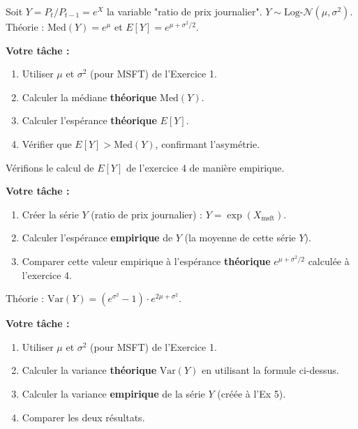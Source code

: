 \begin{exercicebox}
Soit $Y = P_t/P_{t-1} = e^X$ la variable "ratio de prix journalier". $Y \sim \text{Log-}\mathcal{N}(\mu, \sigma^2)$.
Théorie : $\text{Med}(Y) = e^{\mu}$ et $E[Y] = e^{\mu + \sigma^2/2}$.

\textbf{Votre tâche :}
\begin{enumerate}
    \item Utiliser $\mu$ et $\sigma^2$ (pour MSFT) de l'Exercice 1.
    \item Calculer la médiane \textbf{théorique} $\text{Med}(Y)$.
    \item Calculer l'espérance \textbf{théorique} $E[Y]$.
    \item Vérifier que $E[Y] > \text{Med}(Y)$, confirmant l'asymétrie.
\end{enumerate}
\end{exercicebox}

\begin{exercicebox}
Vérifions le calcul de $E[Y]$ de l'exercice 4 de manière empirique.

\textbf{Votre tâche :}
\begin{enumerate}
    \item Créer la série $Y$ (ratio de prix journalier) : $Y = \exp(X_{\text{msft}})$.
    \item Calculer l'espérance \textbf{empirique} de $Y$ (la moyenne de cette série $Y$).
    \item Comparer cette valeur empirique à l'espérance \textbf{théorique} $e^{\mu + \sigma^2/2}$ calculée à l'exercice 4.
\end{enumerate}
\end{exercicebox}

\begin{exercicebox}
Théorie : $\text{Var}(Y) = (e^{\sigma^2} - 1) \cdot e^{2\mu + \sigma^2}$.

\textbf{Votre tâche :}
\begin{enumerate}
    \item Utiliser $\mu$ et $\sigma^2$ (pour MSFT) de l'Exercice 1.
    \item Calculer la variance \textbf{théorique} $\text{Var}(Y)$ en utilisant la formule ci-dessus.
    \item Calculer la variance \textbf{empirique} de la série $Y$ (créée à l'Ex 5).
    \item Comparer les deux résultats.
\end{enumerate}
\end{exercicebox}

